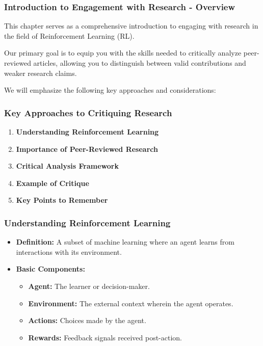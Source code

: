 \documentclass[aspectratio=169]{beamer}
\begin{document}
\frame{\titlepage}

\begin{frame}[fragile]
    \frametitle{Introduction to Engagement with Research - Overview}
    This chapter serves as a comprehensive introduction to engaging with research in the field of Reinforcement Learning (RL).
    
    Our primary goal is to equip you with the skills needed to critically analyze peer-reviewed articles, allowing you to distinguish between valid contributions and weaker research claims. 
    
    We will emphasize the following key approaches and considerations:
\end{frame}

\begin{frame}[fragile]
    \frametitle{Key Approaches to Critiquing Research}
    \begin{enumerate}
        \item \textbf{Understanding Reinforcement Learning}
        \item \textbf{Importance of Peer-Reviewed Research}
        \item \textbf{Critical Analysis Framework}
        \item \textbf{Example of Critique}
        \item \textbf{Key Points to Remember}
    \end{enumerate}
\end{frame}

\begin{frame}[fragile]
    \frametitle{Understanding Reinforcement Learning}
    \begin{itemize}
        \item \textbf{Definition:} A subset of machine learning where an agent learns from interactions with its environment.
        \item \textbf{Basic Components:}
        \begin{itemize}
            \item \textbf{Agent:} The learner or decision-maker.
            \item \textbf{Environment:} The external context wherein the agent operates.
            \item \textbf{Actions:} Choices made by the agent.
            \item \textbf{Rewards:} Feedback signals received post-action.
        \end{itemize}
    \end{itemize}
\end{frame}
\end{document}
